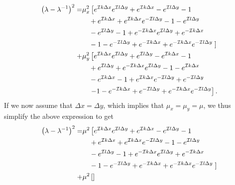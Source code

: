\begin{equation*}
    \begin{split}
    \left(\lambda - \lambda^{-1}\right)^2 = &\mu_x^2\left[  e^{\mathcal{I}k \Delta x}e^{\mathcal{I}l \Delta y}+e^{\mathcal{I}k \Delta x}-e^{\mathcal{I}l \Delta y}-1 \right. \\
    &\quad+e^{\mathcal{I}k \Delta x}+ e^{\mathcal{I}k \Delta x}e^{-\mathcal{I}l \Delta y}-1-e^{\mathcal{I}l \Delta y} \\
     &\quad-e^{\mathcal{I}l \Delta y}-1+e^{-\mathcal{I}k \Delta x}e^{\mathcal{I}l \Delta y}+e^{-\mathcal{I}k \Delta x} \\ 
     &\quad-1-e^{-\mathcal{I}l \Delta y}+e^{-\mathcal{I}k \Delta x}+e^{-\mathcal{I}k \Delta x}e^{-\mathcal{I}l \Delta y} 
    \left.\right] \\
    \vspace{1cm}
    +&\mu_y^2\left[ e^{\mathcal{I}k \Delta x}e^{\mathcal{I}l \Delta y}+e^{\mathcal{I}l \Delta y}-e^{\mathcal{I}k \Delta x}-1  \right.\\
    &\quad+e^{\mathcal{I}l \Delta y}+ e^{-\mathcal{I}k \Delta x}e^{\mathcal{I}l \Delta y}-1-e^{\mathcal{I}k \Delta x} \\
    &\quad-e^{\mathcal{I}k \Delta x}-1+e^{\mathcal{I}k \Delta x}e^{-\mathcal{I}l \Delta y}+e^{-\mathcal{I}l \Delta y} \\ 
    &\quad\left.-1-e^{-\mathcal{I}k \Delta x}+e^{-\mathcal{I}l \Delta y}+e^{-\mathcal{I}k \Delta x}e^{-\mathcal{I}l \Delta y} \right]. 
    \end{split}
\end{equation*}
If we now assume that $\Delta x = \Delta y$, which implies that $\mu_x = \mu_y = \mu$, we thus simplify the above expression to get
\begin{equation*}
    \begin{split}
    \left(\lambda - \lambda^{-1}\right)^2 = &\mu^2\left[  e^{\mathcal{I}k \Delta x}e^{\mathcal{I}l \Delta y}+e^{\mathcal{I}k \Delta x}-e^{\mathcal{I}l \Delta y}-1 \right. \\
    &\quad+e^{\mathcal{I}k \Delta x}+ e^{\mathcal{I}k \Delta x}e^{-\mathcal{I}l \Delta y}-1-e^{\mathcal{I}l \Delta y} \\
     &\quad-e^{\mathcal{I}l \Delta y}-1+e^{-\mathcal{I}k \Delta x}e^{\mathcal{I}l \Delta y}+e^{-\mathcal{I}k \Delta x} \\ 
     &\quad-1-e^{-\mathcal{I}l \Delta y}+e^{-\mathcal{I}k \Delta x}+e^{-\mathcal{I}k \Delta x}e^{-\mathcal{I}l \Delta y} 
    \left.\right] \\
    \vspace{1cm}
    +&\mu^2\left[\right]
    \end{split}
\end{equation*}

